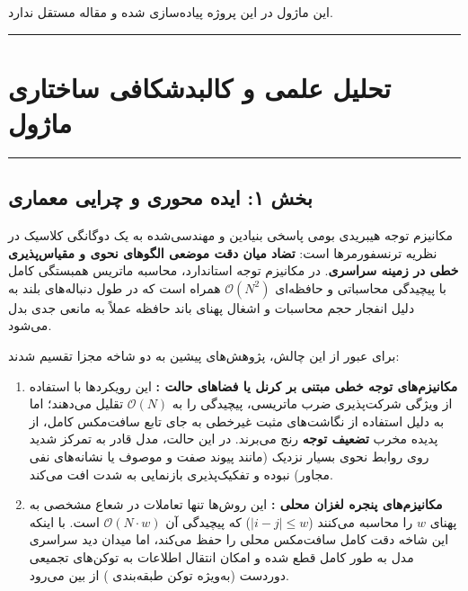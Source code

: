 \clearpage
{}
\vspace*{0.2cm}

این ماژول در این پروژه پیاده‌سازی شده و مقاله مستقل ندارد.
\noindent\rule{\textwidth}{1.2pt}
\vspace*{0.1cm}
\section{تحلیل علمی و کالبدشکافی ساختاری ماژول }
\label{sec:mod_nha_attention}
\vspace*{-0.2cm}
\noindent\rule{\textwidth}{0.5pt}
\vspace*{0.3cm}

\subsection*{بخش ۱: ایده محوری و چرایی معماری }
مکانیزم توجه هیبریدی بومی  پاسخی بنیادین و مهندسی‌شده به یک دوگانگی کلاسیک در نظریه ترنسفورمرها است: \textbf{تضاد میان دقت موضعی الگوهای نحوی و مقیاس‌پذیری خطی در زمینه سراسری}. در مکانیزم توجه استاندارد، محاسبه ماتریس همبستگی کامل با پیچیدگی محاسباتی و حافظه‌ای $\mathcal{O}(N^2)$ همراه است که در طول دنباله‌های بلند به دلیل انفجار حجم محاسبات و اشغال پهنای باند حافظه  عملاً به مانعی جدی بدل می‌شود.

برای عبور از این چالش، پژوهش‌های پیشین به دو شاخه مجزا تقسیم شدند:
\begin{enumerate}
    \item \textbf{مکانیزم‌های توجه خطی مبتنی بر کرنل یا فضاهای حالت :} این رویکردها با استفاده از ویژگی شرکت‌پذیری ضرب ماتریسی، پیچیدگی را به $\mathcal{O}(N)$ تقلیل می‌دهند؛ اما به دلیل استفاده از نگاشت‌های مثبت غیرخطی به جای تابع سافت‌مکس کامل، از پدیده مخرب \textbf{تضعیف توجه } رنج می‌برند. در این حالت، مدل قادر به تمرکز شدید روی روابط نحوی بسیار نزدیک (مانند پیوند صفت و موصوف یا نشانه‌های نفی مجاور) نبوده و تفکیک‌پذیری بازنمایی به شدت افت می‌کند.
    \item \textbf{مکانیزم‌های پنجره لغزان محلی :} این روش‌ها تنها تعاملات در شعاع مشخصی به پهنای $w$ را محاسبه می‌کنند ($|i - j| \le w$) که پیچیدگی آن $\mathcal{O}(N \cdot w)$ است. با اینکه این شاخه دقت کامل سافت‌مکس محلی را حفظ می‌کند، اما میدان دید سراسری مدل به طور کامل قطع شده و امکان انتقال اطلاعات به توکن‌های تجمیعی دوردست (به‌ویژه توکن طبقه‌بندی \lr{[CLS]}) از بین می‌رود.
\end{enumerate}

